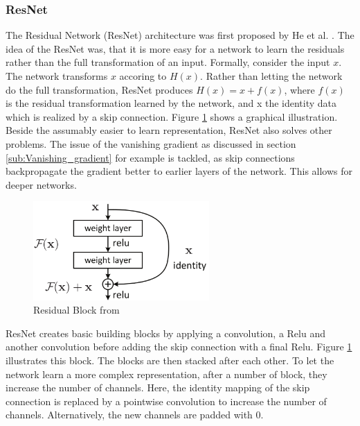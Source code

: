 \subsubsection{ResNet}\label{sub:ResNet}
The Residual Network (ResNet) architecture was first proposed by He et al.
\cite{he2016deep}. The idea of the ResNet was, that it is more easy for a
network to learn the residuals rather than the full transformation of an input.
Formally, consider the input $x$. The network transforms $x$ accoring to $H(x)$.
Rather than letting the network do the full transformation, ResNet produces
$H(x)= x +f(x)$, where $f(x)$ is the residual transformation learned by the
network, and x the identity data which is realized by a skip connection. Figure
\ref{fig:Residual_Block} shows a graphical illustration. Beside the assumably
easier to learn representation, ResNet also solves other problems. The issue of
the vanishing gradient as discussed in section \ref{sub:Vanishing_gradient} for
example is tackled, as skip connections backpropagate the gradient better to
earlier layers of the network. This allows for deeper networks.

\begin{figure}[h]\label{fig:Residual_Block}
    \centering
    \includegraphics[width=0.6\textwidth]{images/Residual_Block.png}
    \caption{Residual Block from \cite[Page 2]{he2016deep}}
\end{figure}

ResNet creates basic building blocks by applying a convolution, a Relu and
another convolution before adding the skip connection with a final Relu. Figure
\ref{fig:Residual_Block} illustrates this block. The blocks are then stacked
after each other. To let the network learn a more complex representation, after
a number of block, they increase the number of channels. Here, the identity
mapping of the skip connection is replaced by a pointwise convolution to
increase the number of channels. Alternatively, the new channels are padded with
0.



